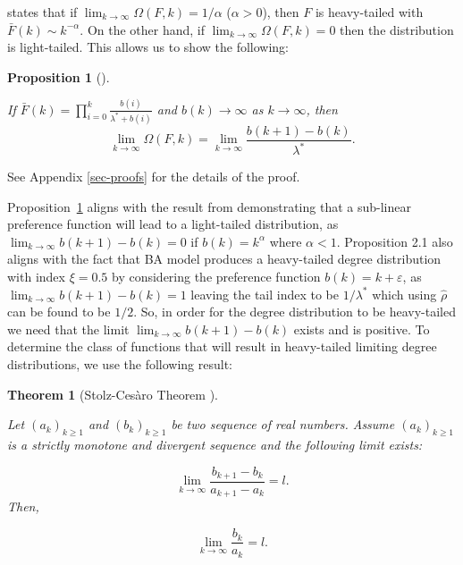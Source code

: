 \documentclass[
  sn-basic,
]{sn-jnl}
\theoremstyle{plain}
\newtheorem{theorem}{Theorem}[section]
\theoremstyle{plain}
\newtheorem{proposition}{Proposition}[section]
\theoremstyle{remark}
\begin{document}
\citet{shimura12} states that if
\(\lim_{k\rightarrow\infty} \Omega(F,k) = 1/\alpha\) (\(\alpha>0\)),
then \(F\) is heavy-tailed with \(\bar F(k) \sim k^{-\alpha}\). On the
other hand, if \(\lim_{k\rightarrow\infty} \Omega(F,k) = 0\) then the
distribution is light-tailed. This allows us to show the following:

\begin{proposition}[]\protect\hypertarget{prp-omega}{}\label{prp-omega}

If \(\bar F(k) = \prod_{i=0}^k\frac{b(i)}{\lambda^* + b(i)}\) and
\(b(k) \rightarrow \infty\) as \(k\rightarrow \infty\), then \[
\lim_{k\rightarrow\infty}\Omega(F,k) = \lim_{k\rightarrow\infty}\frac{b(k+1)-b(k)}{\lambda^*}.
\]

\end{proposition}

See Appendix \ref{sec-proofs} for the details of the proof.

Proposition~\ref{prp-omega} aligns with the result from
\citet{krapivsky01} demonstrating that a sub-linear preference function
will lead to a light-tailed distribution, as
\(\lim_{k\rightarrow\infty} b(k+1)-b(k) = 0\) if \(b(k)=k^\alpha\) where
\(\alpha < 1\). Proposition 2.1 also aligns with the fact that BA model
produces a heavy-tailed degree distribution with index \(\xi=0.5\) by
considering the preference function \(b(k) = k + \varepsilon\), as
\(\lim_{k\rightarrow\infty}b(k+1)-b(k)=1\) leaving the tail index to be
\(1/\lambda^*\) which using \(\hat\rho\) can be found to be \(1/2\). So,
in order for the degree distribution to be heavy-tailed we need that the
limit \(\lim_{k\rightarrow\infty} b(k+1)-b(k)\) exists and is positive.
To determine the class of functions that will result in heavy-tailed
limiting degree distributions, we use the following result:

\begin{theorem}[Stolz-Cesàro Theorem
\citep{cesaro}]\protect\hypertarget{thm-stolz}{}\label{thm-stolz}

Let \((a_k)_{k\ge1}\) and \((b_k)_{k\ge1}\) be two sequence of real
numbers. Assume \((a_k)_{k\ge1}\) is a strictly monotone and divergent
sequence and the following limit exists:

\[
\lim_{k\rightarrow\infty}\frac{b_{k+1} - b_k}{a_{k+1} - a_k} = l.
\] Then,

\[
\lim_{k\rightarrow\infty}\frac{b_k}{a_k} = l.
\]

\end{theorem}
\end{document}
